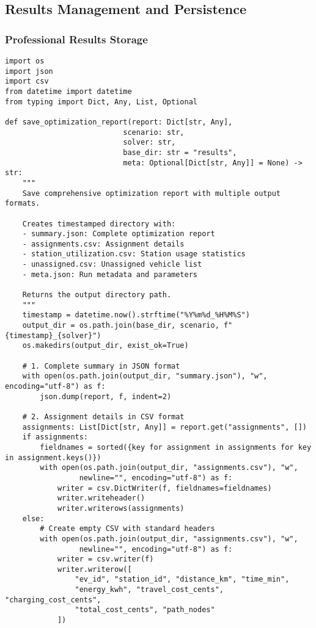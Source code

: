 \documentclass[12pt,a4paper]{article}
\begin{document}
\subsection{Results Management and Persistence}

\subsubsection{Professional Results Storage}

\begin{lstlisting}[caption=Results Management System]
import os
import json
import csv
from datetime import datetime
from typing import Dict, Any, List, Optional

def save_optimization_report(report: Dict[str, Any],
                           scenario: str,
                           solver: str,
                           base_dir: str = "results",
                           meta: Optional[Dict[str, Any]] = None) -> str:
    """
    Save comprehensive optimization report with multiple output formats.
    
    Creates timestamped directory with:
    - summary.json: Complete optimization report
    - assignments.csv: Assignment details
    - station_utilization.csv: Station usage statistics
    - unassigned.csv: Unassigned vehicle list
    - meta.json: Run metadata and parameters
    
    Returns the output directory path.
    """
    timestamp = datetime.now().strftime("%Y%m%d_%H%M%S")
    output_dir = os.path.join(base_dir, scenario, f"{timestamp}_{solver}")
    os.makedirs(output_dir, exist_ok=True)
    
    # 1. Complete summary in JSON format
    with open(os.path.join(output_dir, "summary.json"), "w", encoding="utf-8") as f:
        json.dump(report, f, indent=2)
    
    # 2. Assignment details in CSV format
    assignments: List[Dict[str, Any]] = report.get("assignments", [])
    if assignments:
        fieldnames = sorted({key for assignment in assignments for key in assignment.keys()})
        with open(os.path.join(output_dir, "assignments.csv"), "w", 
                 newline="", encoding="utf-8") as f:
            writer = csv.DictWriter(f, fieldnames=fieldnames)
            writer.writeheader()
            writer.writerows(assignments)
    else:
        # Create empty CSV with standard headers
        with open(os.path.join(output_dir, "assignments.csv"), "w", 
                 newline="", encoding="utf-8") as f:
            writer = csv.writer(f)
            writer.writerow([
                "ev_id", "station_id", "distance_km", "time_min", 
                "energy_kwh", "travel_cost_cents", "charging_cost_cents", 
                "total_cost_cents", "path_nodes"
            ])
    

\end{lstlisting}
\end{document}
